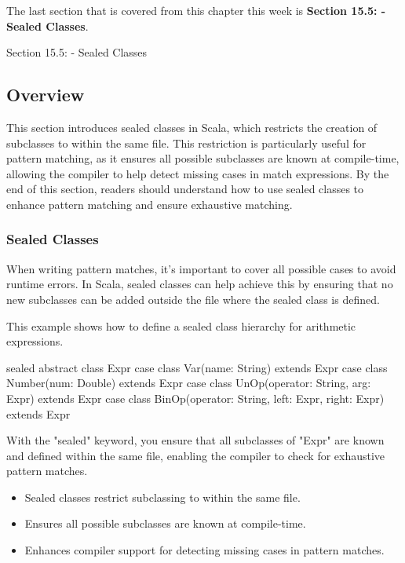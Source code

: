 The last section that is covered from this chapter this week is \textbf{Section 15.5: - Sealed Classes}.

\begin{notes}{Section 15.5: - Sealed Classes}
    \subsection*{Overview}

    This section introduces sealed classes in Scala, which restricts the creation of subclasses to within the same file. This restriction is particularly useful for pattern matching, as it ensures 
    all possible subclasses are known at compile-time, allowing the compiler to help detect missing cases in match expressions. By the end of this section, readers should understand how to use 
    sealed classes to enhance pattern matching and ensure exhaustive matching.
    
    \subsubsection*{Sealed Classes}
    
    When writing pattern matches, it's important to cover all possible cases to avoid runtime errors. In Scala, sealed classes can help achieve this by ensuring that no new subclasses can be added 
    outside the file where the sealed class is defined.
    
    \begin{highlight}
    
        This example shows how to define a sealed class hierarchy for arithmetic expressions.
    
    \begin{code}[Scala]
    sealed abstract class Expr
    case class Var(name: String) extends Expr
    case class Number(num: Double) extends Expr
    case class UnOp(operator: String, arg: Expr) extends Expr
    case class BinOp(operator: String, left: Expr, right: Expr) extends Expr
    \end{code}
    
        With the "sealed" keyword, you ensure that all subclasses of "Expr" are known and defined within the same file, enabling the compiler to check for exhaustive pattern matches.
        
        \begin{itemize}
            \item Sealed classes restrict subclassing to within the same file.
            \item Ensures all possible subclasses are known at compile-time.
            \item Enhances compiler support for detecting missing cases in pattern matches.
        \end{itemize}
    

\end{highlight}
\end{notes}
